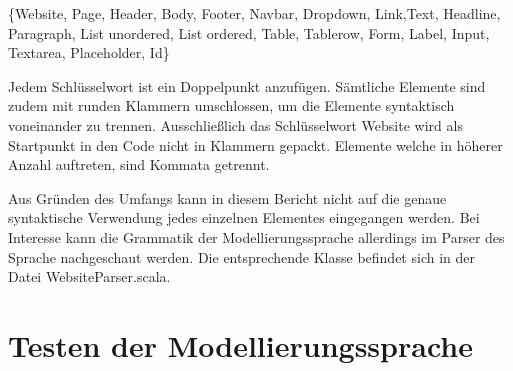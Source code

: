 \{Website, Page, Header, Body, Footer, Navbar, Dropdown, Link,Text, Headline, Paragraph, List unordered, List ordered, Table, Tablerow, Form, Label, Input, Textarea, Placeholder, Id\}

Jedem Schlüsselwort ist ein Doppelpunkt anzufügen. Sämtliche Elemente sind zudem mit runden Klammern umschlossen, um die Elemente syntaktisch voneinander zu trennen. Ausschließlich das Schlüsselwort Website wird als Startpunkt in den Code nicht in Klammern gepackt. Elemente welche in höherer Anzahl auftreten, sind Kommata getrennt.

Aus Gründen des Umfangs kann in diesem Bericht nicht auf die genaue syntaktische Verwendung jedes einzelnen Elementes eingegangen werden. Bei Interesse kann die Grammatik der Modellierungssprache allerdings im Parser des Sprache nachgeschaut werden. Die entsprechende Klasse befindet sich in der Datei WebsiteParser.scala.
\section{Testen der Modellierungssprache}